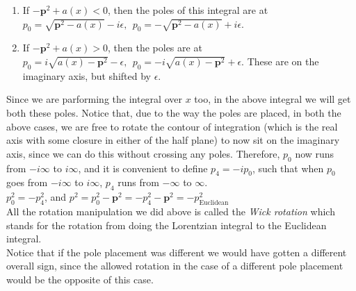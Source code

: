 \documentclass[11pt, notitlepage]{report}
\numberwithin{equation}{section}
\begin{document}
\begin{enumerate}
    \item If \(-\textbf{p}^2 + a(x) <0\), then the poles of this integral are at \(p_0 = \sqrt{\textbf{p}^2 - a(x)} - i\epsilon,~~p_0 = -\sqrt{\textbf{p}^2 - a(x)} + i\epsilon\).
    \begin{figure}[h]
        \centering
    \end{figure} 
    \item If \(-\textbf{p}^2 + a(x) >0\), then the poles are at \(p_0 = i\sqrt{a(x)-\textbf{p}^2 } - \epsilon,~~p_0 = -i\sqrt{a(x)-\textbf{p}^2} + \epsilon\). These are on the imaginary axis, but shifted by \(\epsilon\).
    \begin{figure}[h]
        \centering
    \end{figure} 
\end{enumerate}
Since we are parforming the integral over \(x\) too, in the above integral we will get both these poles. Notice that, due to the way the poles are placed, in both the above cases, we are free to rotate the contour of integration (which is the real axis with some closure in either of the half plane) to now sit on the imaginary axis, since we can do this without crossing any poles. Therefore, \(p_0\) now runs from \(-i\infty\) to \(i\infty\), and it is convenient to define \(p_4 = -ip_0\), such that when \(p_0\) goes from \(-i\infty\) to \(i\infty\), \(p_4\) runs from \(-\infty\) to \(\infty\). \\
\(p_0^2 = - p_4^2\), and \(p^2 = p_0^2 - \textbf{p}^2 = -p_4^2 - \textbf{p}^2 = -p^2_{\text{Euclidean}}\)\\
All the rotation manipulation we did above is called the \textit{Wick rotation} which stands for the rotation from doing the Lorentzian integral to the Euclidean integral.\\

Notice that if the pole placement was different we would have gotten a different overall sign, since the allowed rotation in the case of a different pole placement would be the opposite of this case. \\
\end{document}
